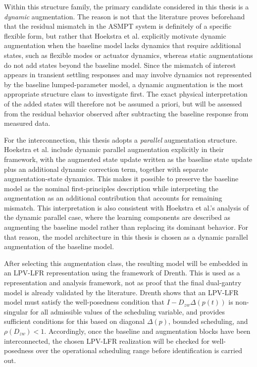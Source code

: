 Within this structure family, the primary candidate considered in this thesis is a \emph{dynamic} augmentation. The reason is not that the literature proves beforehand that the residual mismatch in the ASMPT system is definitely of a specific flexible form, but rather that Hoekstra et al. explicitly motivate dynamic augmentation when the baseline model lacks dynamics that require additional states, such as flexible modes or actuator dynamics, whereas static augmentations do not add states beyond the baseline model. Since the mismatch of interest appears in transient settling responses and may involve dynamics not represented by the baseline lumped-parameter model, a dynamic augmentation is the most appropriate structure class to investigate first. The exact physical interpretation of the added states will therefore not be assumed a priori, but will be assessed from the residual behavior observed after subtracting the baseline response from measured data.

For the interconnection, this thesis adopts a \emph{parallel} augmentation structure. Hoekstra et al. include dynamic parallel augmentation explicitly in their framework, with the augmented state update written as the baseline state update plus an additional dynamic correction term, together with separate augmentation-state dynamics. This makes it possible to preserve the baseline model as the nominal first-principles description while interpreting the augmentation as an additional contribution that accounts for remaining mismatch. This interpretation is also consistent with Hoekstra et al.'s analysis of the dynamic parallel case, where the learning components are described as augmenting the baseline model rather than replacing its dominant behavior. For that reason, the model architecture in this thesis is chosen as a dynamic parallel augmentation of the baseline model.

After selecting this augmentation class, the resulting model will be embedded in an LPV-LFR representation using the framework of Drenth. This is used as a representation and analysis framework, not as proof that the final dual-gantry model is already validated by the literature. Drenth shows that an LPV-LFR model must satisfy the well-posedness condition that $I-D_{zw}\Delta(p(t))$ is non-singular for all admissible values of the scheduling variable, and provides sufficient conditions for this based on diagonal $\Delta(p)$, bounded scheduling, and $\rho(D_{zw})<1$. Accordingly, once the baseline and augmentation blocks have been interconnected, the chosen LPV-LFR realization will be checked for well-posedness over the operational scheduling range before identification is carried out.

